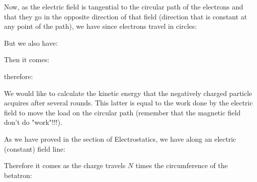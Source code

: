 	Now, as the electric field is tangential to the circular path of the electrons and that they go in the opposite direction of that field (direction that is constant at any point of the path), we have since electrons travel in circles:
	
	But we also have:
	
	Then it comes:
	
	therefore:
	
	We would like to calculate the kinetic energy that the negatively charged particle acquires after several rounds. This latter is equal to the work done by the electric field to move the load on the circular path (remember that the magnetic field don't do "work"!!!).
	
	As we have proved in the section of Electrostatics, we have along an electric (constant) field line:
	
	Therefore it comes as the charge travels $N$ times the circumference of the betatron:
	
